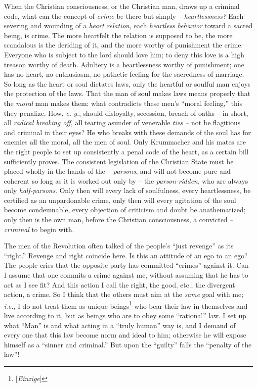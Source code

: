 \documentclass[12pt,a4paper]{book}
\begin{document}
When the Christian consciousness, or the Christian man, draws up a criminal 
code, what can the concept of \textit{crime} be there but simply -- 
\textit{heartlessness?} Each severing and wounding of a \textit{heart 
relation}, each \textit{heartless behavior} toward a sacred being, is crime. 
The more heartfelt the relation is supposed to be, the more scandalous is the 
deriding of it, and the more worthy of punishment the crime. Everyone who is 
subject to the lord should love him; to deny this love is a high treason 
worthy of death. Adultery is a heartlessness worthy of punishment; one has no 
heart, no enthusiasm, no pathetic feeling for the sacredness of marriage. So 
long as the heart or soul dictates laws, only the heartful or soulful man 
enjoys the protection of the laws. That the man of soul makes laws means 
properly that the \textit{moral} man makes them: what contradicts these men's 
``moral feeling,'' this they penalize. How, \textit{e. g.}, should 
disloyalty, secession, breach of oaths -- in short, all \textit{radical 
breaking off}, all tearing asunder of venerable \textit{ties --} not be 
flagitious and criminal in their eyes? He who breaks with these demands of the 
soul has for enemies all the moral, all the men of soul. Only Krummacher and 
his mates are the right people to set up consistently a penal code of the 
heart, as a certain bill sufficiently proves. The consistent legislation of 
the Christian State must be placed wholly in the hands of the -- 
\textit{parsons}, and will not become pure and coherent so long as it is 
worked out only by -- the \textit{parson-ridden}, who are always only 
\textit{half-parsons}. Only then will every lack of soulfulness, every 
heartlessness, be certified as an unpardonable crime, only then will every 
agitation of the soul become condemnable, every objection of criticism and 
doubt be anathematized; only then is the own man, before the Christian 
consciousness, a convicted -- \textit{criminal} to begin with.

The men of the Revolution often talked of the people's ``just revenge'' as 
its ``right.'' Revenge and right coincide here. Is this an attitude of an 
ego to an ego? The people cries that the opposite party has committed 
``crimes'' against it. Can I assume that one commits a crime against me, 
without assuming that he has to act as I see fit? And this action I call the 
right, the good, etc.; the divergent action, a crime. So I think that the 
others must aim at the \textit{same} goal with me; \textit{i.e.}, I do not 
treat them as unique beings\footnote{[\textit{Einzige}]} who bear their law in 
themselves and live according to it, but as beings who are to obey some 
``rational'' law. I set up what ``Man'' is and what acting in a ``truly 
human'' way is, and I demand of every one that this law become norm and ideal 
to him; otherwise he will expose himself as a ``sinner and criminal.'' But 
upon the ``guilty'' falls the ``penalty of the law''!
\end{document}
